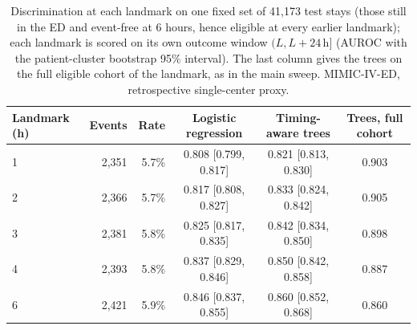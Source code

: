 \begin{table}[t]
\centering
\caption{Discrimination at each landmark on one fixed set of 41,173 test stays (those still in the ED and event-free at 6 hours, hence eligible at every earlier landmark); each landmark is scored on its own outcome window $(L, L + 24$\,h$]$ (AUROC with the patient-cluster bootstrap 95\% interval). The last column gives the trees on the full eligible cohort of the landmark, as in the main sweep. MIMIC-IV-ED, retrospective single-center proxy.}
\label{tab:fixed-cohort}
\begin{tabular}{lrrccc}
\toprule
Landmark (h) & Events & Rate & Logistic regression & Timing-aware trees & Trees, full cohort \\
\midrule
1 & 2,351 & 5.7\% & 0.808 [0.799, 0.817] & 0.821 [0.813, 0.830] & 0.903 \\
2 & 2,366 & 5.7\% & 0.817 [0.808, 0.827] & 0.833 [0.824, 0.842] & 0.905 \\
3 & 2,381 & 5.8\% & 0.825 [0.817, 0.835] & 0.842 [0.834, 0.850] & 0.898 \\
4 & 2,393 & 5.8\% & 0.837 [0.829, 0.846] & 0.850 [0.842, 0.858] & 0.887 \\
6 & 2,421 & 5.9\% & 0.846 [0.837, 0.855] & 0.860 [0.852, 0.868] & 0.860 \\
\bottomrule
\end{tabular}
\end{table}
